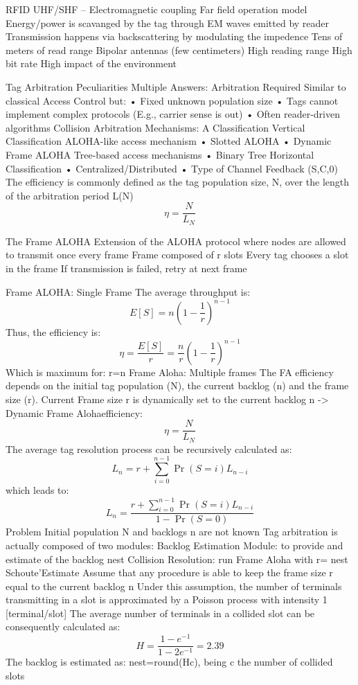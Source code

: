 RFID UHF/SHF – Electromagnetic coupling
Far field operation model
Energy/power is scavanged by the tag through EM waves emitted by
reader
Transmission happens via backscattering by modulating the impedence
Tens of meters of read range
Bipolar antennas (few centimeters)
High reading range
High bit rate
High impact of the environment


Tag Arbitration Peculiarities
Multiple Answers: Arbitration Required Similar to classical Access Control but:
• Fixed unknown population size
• Tags cannot implement complex protocols (E.g., carrier sense is out)
• Often reader-driven algorithms
Collision Arbitration Mechanisms: A Classification
Vertical Classification
ALOHA-like access mechanism
• Slotted ALOHA
• Dynamic Frame ALOHA
Tree-based access mechanisms
• Binary Tree
Horizontal Classification
• Centralized/Distributed
• Type of Channel Feedback (S,C,0)
The efficiency is commonly defined as the tag population size, N, over the
length of the arbitration period L(N)
\[\eta=\dfrac{N}{L_N}\]

The Frame ALOHA Extension of the ALOHA protocol where nodes are allowed to transmit
once every frame
Frame composed of r slots
Every tag chooses a slot in the frame
If transmission is failed, retry at next frame

Frame ALOHA: Single Frame
The average throughput is:
\[E[S]=n\left(1-\dfrac{1}{r}\right)^{n-1}\]
Thus, the efficiency is:
\[\eta=\dfrac{E[S]}{r}=\dfrac{n}{r}\left(1-\dfrac{1}{r}\right)^{n-1}\]
Which is maximum for: r=n
Frame Aloha: Multiple frames
The FA efficiency depends on the initial tag population (N), the current
backlog (n) and the frame size (r).
Current Frame size r is dynamically set to the current backlog n ->
Dynamic Frame Alohaefficiency: 
\[\eta=\dfrac{N}{L_N}\]
The average tag resolution process can be recursively calculated as:
\[L_n=r+\sum_{i=0}^{n-1}\Pr(S=i)L_{n-i}\]
which leads to: 
\[L_n=\dfrac{r+\sum_{i=0}^{n-1}\Pr(S=i)L_{n-i}}{1-\Pr(S=0)}\]
Problem
Initial population N and backlogs n are not known
Tag arbitration is actually composed of two modules:
Backlog Estimation Module: to provide and estimate of the backlog nest
Collision Resolution: run Frame Aloha with r= nest
Schoute’Estimate
Assume that any procedure is able to keep the frame size r equal to the
current backlog n
Under this assumption, the number of terminals transmitting in a slot is
approximated by a Poisson process with intensity 1 [terminal/slot]
The average number of terminals in a collided slot can be consequently
calculated as: 
\[H=\dfrac{1-e^{-1}}{1-2e^{-1}}=2.39\]
The backlog is estimated as:
nest=round(Hc), being c the number of collided slots

